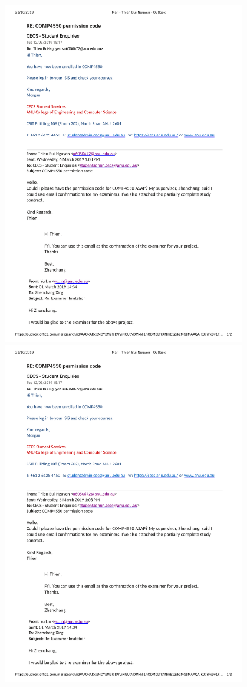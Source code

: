 \includegraphics[page=1,width=0.8\textwidth]{figs/examiner.pdf} \newpage
\includegraphics[page=2,width=0.8\textwidth]{figs/examiner.pdf} \\
\flushleft